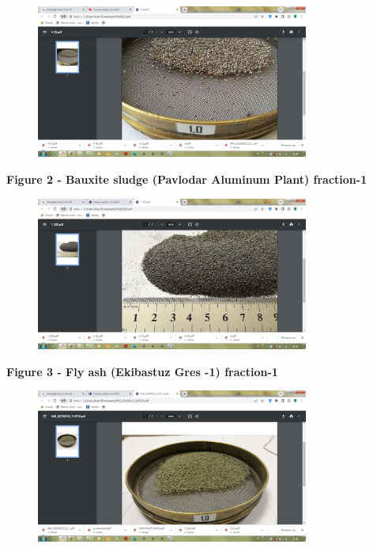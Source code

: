 \begin{figure}[H]
	\centering
	\includegraphics[width=0.8\textwidth]{assets/268}
	\caption*{}
\end{figure}

{\bfseries Figure 2 - Bauxite sludge (Pavlodar Aluminum Plant) fraction-1}

\begin{figure}[H]
	\centering
	\includegraphics[width=0.8\textwidth]{assets/269}
	\caption*{}
\end{figure}

{\bfseries Figure 3 - Fly ash (Ekibastuz Gres -1) fraction-1}

\begin{figure}[H]
	\centering
	\includegraphics[width=0.8\textwidth]{assets/270}
	\caption*{}
\end{figure}

